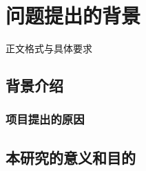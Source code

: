 \section{问题提出的背景}

\par 正文格式与具体要求\cite{zjuthesisrules}

\subsection{背景介绍}

\subsubsection{项目提出的原因}

\subsection{本研究的意义和目的}
